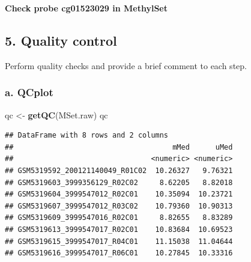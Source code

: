 \documentclass[
  11pt,
]{article}
\newenvironment{Shaded}{\begin{snugshade}}{\end{snugshade}}
\newcommand{\FunctionTok}[1]{\textcolor[rgb]{0.13,0.29,0.53}{\textbf{#1}}}
\newcommand{\NormalTok}[1]{#1}
\newcommand{\OtherTok}[1]{\textcolor[rgb]{0.56,0.35,0.01}{#1}}
\newcommand{\SpecialCharTok}[1]{\textcolor[rgb]{0.81,0.36,0.00}{\textbf{#1}}}
\newcommand{\StringTok}[1]{\textcolor[rgb]{0.31,0.60,0.02}{#1}}
\begin{document}
\textbf{Check probe cg01523029 in MethylSet}

\begin{Shaded}
\end{Shaded}

\subsection{5. Quality control}\label{quality-control}

Perform quality checks and provide a brief comment to each step.

\subsubsection{a. QCplot}\label{a.-qcplot}

\begin{Shaded}
\begin{Highlighting}[]
\NormalTok{qc }\OtherTok{\textless{}{-}} \FunctionTok{getQC}\NormalTok{(MSet.raw)}
\NormalTok{qc}
\end{Highlighting}
\end{Shaded}

\begin{verbatim}
## DataFrame with 8 rows and 2 columns
##                                     mMed      uMed
##                                <numeric> <numeric>
## GSM5319592_200121140049_R01C02  10.26327   9.76321
## GSM5319603_3999356129_R02C02     8.62205   8.82018
## GSM5319604_3999547012_R02C01    10.35094  10.23721
## GSM5319607_3999547012_R03C02    10.79360  10.90313
## GSM5319609_3999547016_R02C01     8.82655   8.83289
## GSM5319613_3999547017_R02C01    10.83684  10.69523
## GSM5319615_3999547017_R04C01    11.15038  11.04644
## GSM5319616_3999547017_R06C01    10.27845  10.33316
\end{verbatim}
\end{document}
